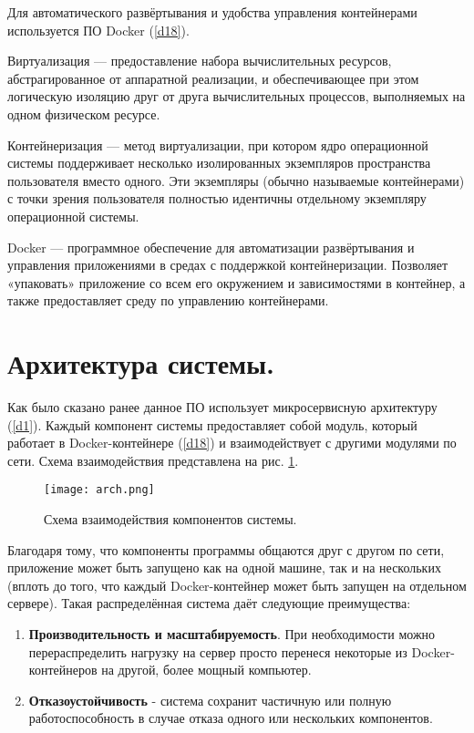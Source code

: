 Для автоматического развёртывания и удобства управления контейнерами используется ПО Docker (\ref{d18}).
\begin{definition}
    \label{d16}
    Виртуализация — предоставление набора вычислительных ресурсов, абстрагированное от аппаратной реализации,
    и обеспечивающее при этом логическую изоляцию друг от друга вычислительных процессов, выполняемых на одном
    физическом ресурсе. 
\end{definition}
\begin{definition}
    \label{d17}
    Контейнеризация — метод виртуализации, при котором ядро операционной системы поддерживает несколько изолированных
    экземпляров пространства пользователя вместо одного. Эти экземпляры (обычно называемые контейнерами) с точки зрения
    пользователя полностью идентичны отдельному экземпляру операционной системы.
\end{definition}
\begin{definition}
    \label{d18}
    Docker — программное обеспечение для автоматизации развёртывания и управления приложениями в средах с
    поддержкой контейнеризации. Позволяет «упаковать» приложение со всем его окружением и зависимостями в контейнер,
    а также предоставляет среду по управлению контейнерами.
\end{definition}

\clearpage

\section{Архитектура системы.}

Как было сказано ранее данное ПО использует микросервисную архитектуру (\ref{d1}). Каждый компонент системы предоставляет
собой модуль, который работает в Docker-контейнере (\ref{d18}) и взаимодействует с другими модулями по сети.
Схема взаимодействия представлена на рис. \ref{fig:arch}.

\begin{figure}[h]
    \centering
    \texttt{[image: arch.png]}
    \caption{Схема взаимодействия компонентов системы.}
    \label{fig:arch}
\end{figure}

\noindent Благодаря тому, что компоненты программы общаются друг с другом по сети, приложение может быть запущено как
на одной машине, так и на нескольких (вплоть до того, что каждый Docker-контейнер может быть запущен на отдельном сервере).
Такая распределённая система даёт следующие преимущества:
\begin{enumerate}
    \item \textbf{Производительность и масштабируемость}. При необходимости можно перераспределить нагрузку на сервер
    просто перенеся некоторые из Docker-контейнеров на другой, более мощный компьютер.
    \item \textbf{Отказоустойчивость} - система сохранит частичную или полную работоспособность в случае отказа одного
    или нескольких компонентов.
\end{enumerate}

